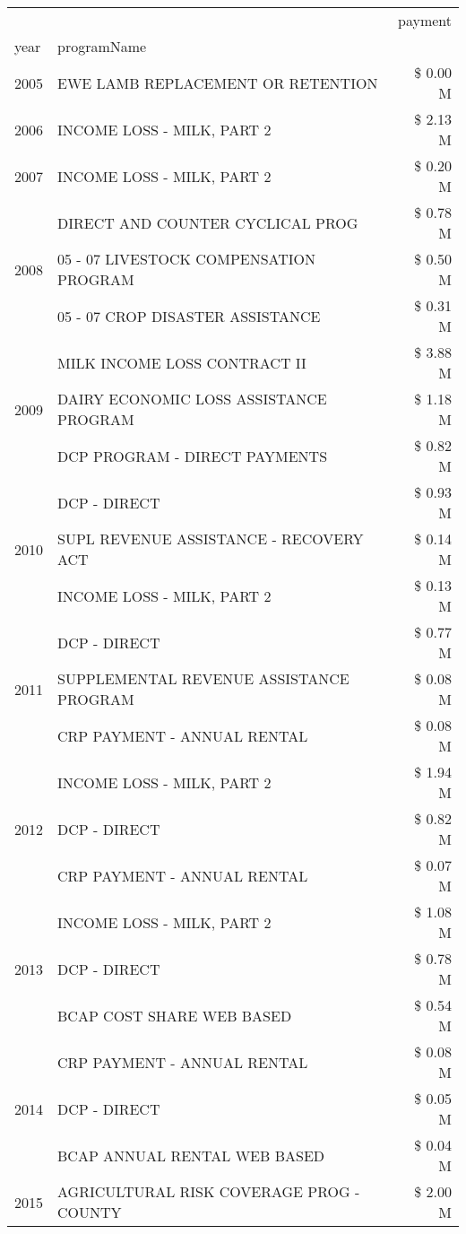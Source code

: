\begin{tabular}{llr}
\toprule
 &  & payment \\
year & programName &  \\
\midrule
2005 & EWE LAMB REPLACEMENT OR RETENTION & \$ 0.00 M \\
\cline{1-3}
2006 & INCOME LOSS - MILK, PART 2 & \$ 2.13 M \\
\cline{1-3}
2007 & INCOME LOSS - MILK, PART 2 & \$ 0.20 M \\
\cline{1-3}
\multirow[t]{3}{*}{2008} & DIRECT AND COUNTER CYCLICAL PROG & \$ 0.78 M \\
 & 05 - 07 LIVESTOCK COMPENSATION PROGRAM & \$ 0.50 M \\
 & 05 - 07 CROP DISASTER ASSISTANCE & \$ 0.31 M \\
\cline{1-3}
\multirow[t]{3}{*}{2009} & MILK INCOME LOSS CONTRACT II & \$ 3.88 M \\
 & DAIRY ECONOMIC LOSS ASSISTANCE PROGRAM & \$ 1.18 M \\
 & DCP PROGRAM - DIRECT PAYMENTS & \$ 0.82 M \\
\cline{1-3}
\multirow[t]{3}{*}{2010} & DCP - DIRECT & \$ 0.93 M \\
 & SUPL REVENUE ASSISTANCE - RECOVERY ACT & \$ 0.14 M \\
 & INCOME LOSS - MILK, PART 2 & \$ 0.13 M \\
\cline{1-3}
\multirow[t]{3}{*}{2011} & DCP - DIRECT & \$ 0.77 M \\
 & SUPPLEMENTAL REVENUE ASSISTANCE PROGRAM & \$ 0.08 M \\
 & CRP PAYMENT - ANNUAL RENTAL & \$ 0.08 M \\
\cline{1-3}
\multirow[t]{3}{*}{2012} & INCOME LOSS - MILK, PART 2 & \$ 1.94 M \\
 & DCP - DIRECT & \$ 0.82 M \\
 & CRP PAYMENT - ANNUAL RENTAL & \$ 0.07 M \\
\cline{1-3}
\multirow[t]{3}{*}{2013} & INCOME LOSS - MILK, PART 2 & \$ 1.08 M \\
 & DCP - DIRECT & \$ 0.78 M \\
 & BCAP COST SHARE WEB BASED & \$ 0.54 M \\
\cline{1-3}
\multirow[t]{3}{*}{2014} & CRP PAYMENT - ANNUAL RENTAL & \$ 0.08 M \\
 & DCP - DIRECT & \$ 0.05 M \\
 & BCAP ANNUAL RENTAL WEB BASED & \$ 0.04 M \\
\cline{1-3}
\multirow[t]{3}{*}{2015} & AGRICULTURAL RISK COVERAGE PROG - COUNTY & \$ 2.00 M \\

\end{tabular}
